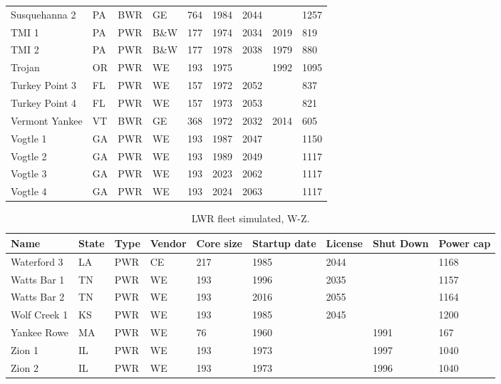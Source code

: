 \begin{table}[H]
\begin{tabular}{l l l l l l l l l}
    Susquehanna 2       & PA & BWR & GE   & 764 & 1984 & 2044 &      & 1257 \\
    TMI 1               & PA & PWR & B\&W & 177 & 1974 & 2034 & 2019 & 819 \\
    TMI 2               & PA & PWR & B\&W & 177 & 1978 & 2038 & 1979 & 880 \\
    Trojan              & OR & PWR & WE   & 193 & 1975 &      & 1992 & 1095 \\
    Turkey Point 3      & FL & PWR & WE   & 157 & 1972 & 2052 &      & 837 \\
    Turkey Point 4      & FL & PWR & WE   & 157 & 1973 & 2053 &      & 821 \\
    Vermont Yankee      & VT & BWR & GE   & 368 & 1972 & 2032 & 2014 & 605 \\
    Vogtle 1            & GA & PWR & WE   & 193 & 1987 & 2047 &      & 1150 \\
    Vogtle 2            & GA & PWR & WE   & 193 & 1989 & 2049 &      & 1117 \\
    Vogtle 3            & GA & PWR & WE   & 193 & 2023 & 2062 &      & 1117 \\
    Vogtle 4            & GA & PWR & WE   & 193 & 2024 & 2063 &      & 1117 \\
    \hline
    \end{tabular}
\end{table}

\begin{table}[H]
    \centering
    \caption{LWR fleet simulated, W-Z.}
    \label{tab:lwr_fleet5}
    \begin{tabular}{l l l l l l l l l}
    \hline
    \textbf{Name} & \textbf{State} & \textbf{Type} & \textbf{Vendor} & \textbf{Core size} & \textbf{Startup date} & \textbf{License} & \textbf{Shut Down} & \textbf{Power cap} \\
    \hline
    Waterford 3         & LA & PWR & CE   & 217 & 1985 & 2044 &      & 1168 \\
    Watts Bar 1         & TN & PWR & WE   & 193 & 1996 & 2035 &      & 1157 \\
    Watts Bar 2         & TN & PWR & WE   & 193 & 2016 & 2055 &      & 1164 \\
    Wolf Creek 1        & KS & PWR & WE   & 193 & 1985 & 2045 &      & 1200 \\
    Yankee Rowe         & MA & PWR & WE   & 76  & 1960 &      & 1991 & 167 \\
    Zion 1              & IL & PWR & WE   & 193 & 1973 &      & 1997 & 1040 \\
    Zion 2              & IL & PWR & WE   & 193 & 1973 &      & 1996 & 1040 \\
    \hline
    \end{tabular}
\end{table}